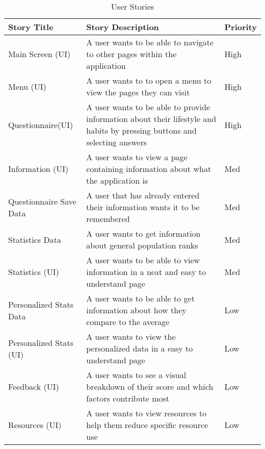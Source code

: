\documentclass[onecolumn, draftclsnofoot,10pt, compsoc, tikz]{IEEEtran}
\begin{document}
\begin{table}[h!]
\caption{User Stories}
\begin{center}
\begin{tabular}{ | m{12em} | m{7cm} | m{2cm} |}
    \hline Story Title & Story Description & Priority \\
    \hline Main Screen (UI) & A user wants to be able to navigate to other pages within the application & High\\
    \hline Menu (UI) & A user wants to to open a menu to view the pages they can visit & High \\
    \hline Questionnaire(UI) & A user wants to be able to provide information about their lifestyle and habits by pressing buttons and selecting answers & High\\
    \hline Information (UI) & A user wants to view a page containing information about what the application is & Med \\
    \hline Questionnaire Save Data & A user that has already entered their information wants it to be remembered & Med\\
    \hline Statistics Data & A user wants to get information about general population ranks & Med\\
    \hline Statistics (UI) & A user wants to be able to view information in a neat and easy to understand page & Med\\
    \hline Personalized Stats Data & A user wants to be able to get information about how they compare to the average & Low\\
    \hline Personalized Stats (UI) & A user wants to view the personalized data in a easy to understand page & Low \\ 
    \hline Feedback (UI) & A user wants to see a visual breakdown of their score and which factors contribute most & Low \\
    \hline Resources (UI) & A user wants to view resources to help them reduce specific resource use & Low \\
    \hline
\end{tabular}
\end{center}
\end{table}
\clearpage
\end{document}
